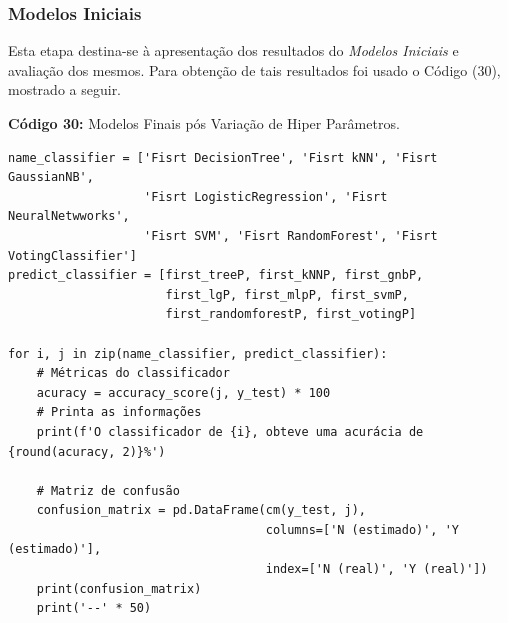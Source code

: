 \documentclass[a4paper,12pt]{article} %
\begin{document}
\subsubsection{Modelos Iniciais} \label{section:4.1.1}
Esta etapa destina-se à apresentação dos resultados do \textit{Modelos Iniciais} e avaliação dos mesmos. Para obtenção de tais resultados foi usado o Código (30), mostrado  a seguir.
\begin{center}
\textbf{Código 30:} Modelos Finais pós Variação de Hiper Parâmetros.
\begin{verbatim}
name_classifier = ['Fisrt DecisionTree', 'Fisrt kNN', 'Fisrt GaussianNB',
                   'Fisrt LogisticRegression', 'Fisrt NeuralNetwworks', 
                   'Fisrt SVM', 'Fisrt RandomForest', 'Fisrt VotingClassifier']
predict_classifier = [first_treeP, first_kNNP, first_gnbP,
                      first_lgP, first_mlpP, first_svmP,
                      first_randomforestP, first_votingP]

for i, j in zip(name_classifier, predict_classifier):
    # Métricas do classificador
    acuracy = accuracy_score(j, y_test) * 100
    # Printa as informações
    print(f'O classificador de {i}, obteve uma acurácia de {round(acuracy, 2)}%')

    # Matriz de confusão
    confusion_matrix = pd.DataFrame(cm(y_test, j),
                                    columns=['N (estimado)', 'Y (estimado)'],
                                    index=['N (real)', 'Y (real)'])
    print(confusion_matrix)
    print('--' * 50)
\end{verbatim}
\end{center}
\end{document}
